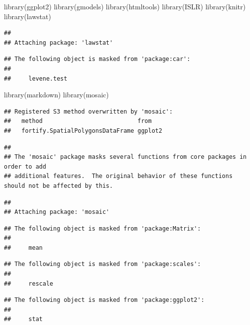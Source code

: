\documentclass[
]{article}
\newenvironment{Shaded}{\begin{snugshade}}{\end{snugshade}}
\newcommand{\FunctionTok}[1]{\textcolor[rgb]{0.00,0.00,0.00}{#1}}
\newcommand{\NormalTok}[1]{#1}
\begin{document}
\begin{Shaded}
\begin{Highlighting}[]
\FunctionTok{library}\NormalTok{(ggplot2)}
\FunctionTok{library}\NormalTok{(gmodels)}
\FunctionTok{library}\NormalTok{(htmltools)}
\FunctionTok{library}\NormalTok{(ISLR)}
\FunctionTok{library}\NormalTok{(knitr)}
\FunctionTok{library}\NormalTok{(lawstat)}
\end{Highlighting}
\end{Shaded}

\begin{verbatim}
## 
## Attaching package: 'lawstat'
\end{verbatim}

\begin{verbatim}
## The following object is masked from 'package:car':
## 
##     levene.test
\end{verbatim}

\begin{Shaded}
\begin{Highlighting}[]
\FunctionTok{library}\NormalTok{(markdown)}
\FunctionTok{library}\NormalTok{(mosaic)}
\end{Highlighting}
\end{Shaded}

\begin{verbatim}
## Registered S3 method overwritten by 'mosaic':
##   method                           from   
##   fortify.SpatialPolygonsDataFrame ggplot2
\end{verbatim}

\begin{verbatim}
## 
## The 'mosaic' package masks several functions from core packages in order to add 
## additional features.  The original behavior of these functions should not be affected by this.
\end{verbatim}

\begin{verbatim}
## 
## Attaching package: 'mosaic'
\end{verbatim}

\begin{verbatim}
## The following object is masked from 'package:Matrix':
## 
##     mean
\end{verbatim}

\begin{verbatim}
## The following object is masked from 'package:scales':
## 
##     rescale
\end{verbatim}

\begin{verbatim}
## The following object is masked from 'package:ggplot2':
## 
##     stat
\end{verbatim}
\end{document}
